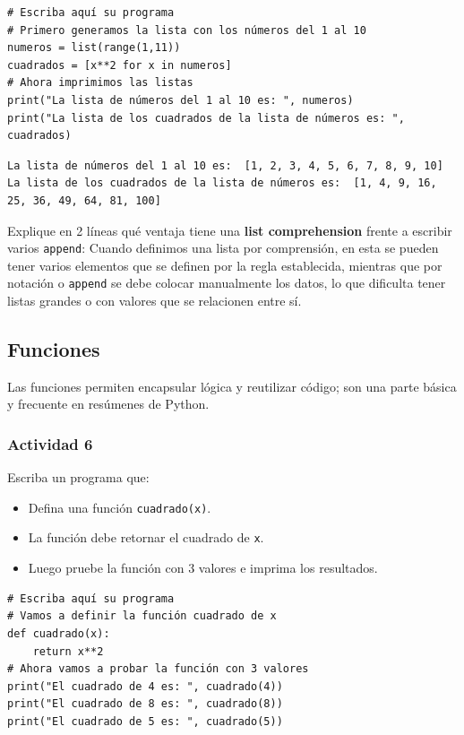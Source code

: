 \documentclass{article}
\begin{document}
\begin{verbatim}
# Escriba aquí su programa
# Primero generamos la lista con los números del 1 al 10
numeros = list(range(1,11))
cuadrados = [x**2 for x in numeros]
# Ahora imprimimos las listas
print("La lista de números del 1 al 10 es: ", numeros)
print("La lista de los cuadrados de la lista de números es: ", cuadrados)
\end{verbatim}

\begin{verbatim}
La lista de números del 1 al 10 es:  [1, 2, 3, 4, 5, 6, 7, 8, 9, 10]
La lista de los cuadrados de la lista de números es:  [1, 4, 9, 16, 25, 36, 49, 64, 81, 100]
\end{verbatim}


Explique en 2 líneas qué ventaja tiene una \textbf{list comprehension} frente
a escribir varios \texttt{append}:
Cuando definimos una lista por comprensión, en esta se pueden tener
varios elementos que se definen por la regla establecida, mientras que
por notación o \texttt{append} se debe colocar manualmente los datos, lo que
dificulta tener listas grandes o con valores que se relacionen entre sí.

\subsection{Funciones}
\label{sec:orgf5a29c7}
Las funciones permiten encapsular lógica y reutilizar código; son una parte básica y frecuente en resúmenes de Python.

\subsubsection{Actividad 6}
\label{sec:org8090bd4}
Escriba un programa que:
\begin{itemize}
\item Defina una función \texttt{cuadrado(x)}.
\item La función debe retornar el cuadrado de \texttt{x}.
\item Luego pruebe la función con 3 valores e imprima los resultados.
\end{itemize}

\begin{verbatim}
# Escriba aquí su programa
# Vamos a definir la función cuadrado de x
def cuadrado(x):
    return x**2
# Ahora vamos a probar la función con 3 valores
print("El cuadrado de 4 es: ", cuadrado(4))
print("El cuadrado de 8 es: ", cuadrado(8))
print("El cuadrado de 5 es: ", cuadrado(5))
\end{verbatim}
\end{document}
